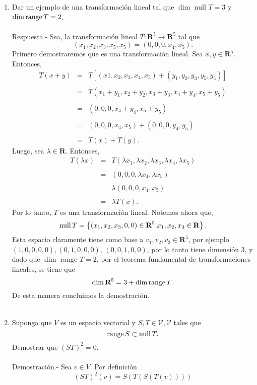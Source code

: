 \begin{enumerate}[\bfseries 1.]

    \item Dar un ejemplo de una transformación lineal tal que $\dim$ null $T=3$ y $\dim \operatorname{range} T=2$.\\\\
	Respuesta.-\; Sea, la transformación lineal $T:\textbf{R}^5 \to \textbf{R}^5$ tal que 
	$$(x_1,x_2,x_3,x_5,x_5)=(0,0,0,x_4,x_5).$$
	Primero demostraremos que es una transformación lineal. Sea $x,y\in \textbf{R}^5$. Entonces,
	$$
	\begin{array}{rcl}
	    T(x+y) &=& T\left[(x1,x_2,x_3,x_4,x_5)+(y_1,y_2,y_3,y_5,y_5)\right]\\\\
		   &=& T(x_1+y_1,x_2+y_2,x_3+y_3,x_4+y_4,x_5+y_5)\\\\
		   &=& (0,0,0,x_4+y_4,x_5+y_5)\\\\
		   &=& (0,0,0,x_4,x_5)+(0,0,0,y_4,y_5)\\\\
		   &=& T(x)+T(y).
	\end{array}
	$$
	Luego, sea $\lambda \in \textbf{R}$. Entonces,
	$$
	\begin{array}{rcl}
	    T(\lambda x) &=& T(\lambda x_1,\lambda x_2,\lambda x_3,\lambda x_4,\lambda x_5)\\\\
			 &=& (0,0,0,\lambda x_4,\lambda x_5)\\\\
			 &=& \lambda(0,0,0,x_4,x_5)\\\\
			 &=& \lambda T(x).
	\end{array}
	$$
	Por lo tanto, $T$ es una transformación lineal.  Notemos ahora que,
	$$\operatorname{null} T=\left\{(x_1,x_2,x_3,0,0)\in \textbf{R}^5 | x_1,x_2,x_3\in \textbf{R}\right\}.$$
	Esta espacio claramente tiene como base a $v_1,v_2,v_3\in \textbf{R}^5$, por ejemplo $(1,0,0,0,0),(0,1,0,0,0)$, $(0,0,1,0,0)$, por lo tanto tiene dimensión $3$, y dado que $\dim$ range $T=2$, por el teorema fundamental de transformaciones lineales, se tiene que
	$$\dim \textbf{R}^5=3+\dim \operatorname{range} T.$$
	De esta manera concluimos la demostración.\\\\

    \item Suponga que $V$ es un espacio vectorial y $S,T\in \mathcal{V,V}$ tales que
    $$\operatorname{range} S\subset \operatorname{null} T.$$
    Demostrar que $(ST)^2=0.$\\\\
	Demostración.-\; Sea $v\in V$. Por definición 
	$$(ST)^2(v)=S\left(T(S(T(v)))\right)$$


\end{enumerate}
